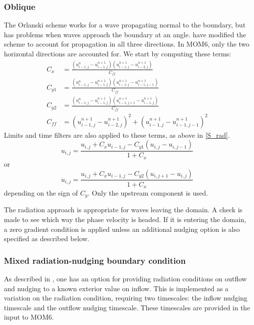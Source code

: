 \documentclass[11pt]{article}
\begin{document}
\subsubsection{Oblique}
The Orlanski scheme works for a wave propagating normal to the boundary, but
has problems when waves approach the boundary at an angle.
\citet{Raymond84} have modified the scheme to account for
propagation in all three directions. In MOM6, only the two horizontal
directions are accounted for. We start by computing these terms:
\begin{align}
  C_x &= \frac{(u^n_{i-1,j} - u^{n+1}_{i-1,j})(u^{n+1}_{i-1,j} - u^{n+1}_{i-2,j})}{C_{ff}} \\
  C_{y1} &= \frac{(u^n_{i-1,j} - u^{n+1}_{i-1,j})(u^{n+1}_{i-1,j} - u^{n+1}_{i-1,j-1})}{C_{ff}} \\
  C_{y2} &= \frac{(u^n_{i-1,j} - u^{n+1}_{i-1,j})(u^{n+1}_{i-1,j+1} - u^{n+1}_{i-1,j})}{C_{ff}} \\
  C_{ff} &= (u^{n+1}_{i-1,j} - u^{n+1}_{i-2,j})^2 + (u^{n+1}_{i-1,j} - u^{n+1}_{i-1,j-1})^2 
\end{align}
Limits and time filters are also applied to these terms, as above in \ref{S_rad}.
\begin{equation}
   u_{i,j} = \frac{u_{i,j} + C_x u_{i-1,j} - C_{y1} (u_{i,j} - u_{i,j-1})}{1 + C_x}
\label{eqrka}
\end{equation}
or
\begin{equation}
   u_{i,j} = \frac{u_{i,j} + C_x u_{i-1,j} - C_{y2} (u_{i,j+1} - u_{i,j})}{1 + C_x}
\label{eqrkb}
\end{equation}
depending on the sign of $C_y$. Only the upstream component is used.

The radiation approach is appropriate for waves leaving the domain. A
check is made to see which way the phase velocity is headed. If it
is entering the domain, a zero gradient condition is applied unless
an additional nudging option is also specified as described below.

\subsubsection{Mixed radiation-nudging boundary condition}
As described in \citep{Marchesiello2001}, one has an option for providing
radiation conditions on outflow and nudging to a known exterior
value on inflow. This is implemented as a variation on the radiation
condition, requiring two timescales: the inflow nudging timescale and the
outflow nudging timescale. These timescales are provided in the input to
MOM6.
\end{document}
